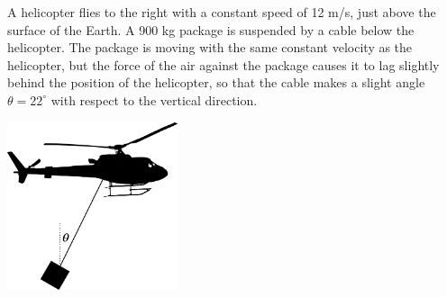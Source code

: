 \question A helicopter flies to the right with a constant speed of 12 m/s, just above the surface of the Earth. A 900 kg package is suspended by a cable below the helicopter. The package is moving with the same constant velocity as the helicopter, but the force of the air against the package causes it to lag slightly behind the position of the helicopter, so that the cable makes a slight angle $\theta=22^\circ$ with respect to the vertical direction.
\begin{center}
	\includegraphics[width=5cm]{helicopter.pdf}
\end{center}


